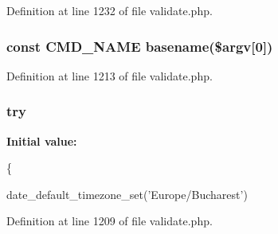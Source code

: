 Definition at line 1232 of file validate.\+php.

\hypertarget{validate_8php_a0b8cd04242aae1a86ebfb94e357edf41}{
\subsubsection[{C\+M\+D\+\_\+\+N\+A\+M\+E}]{\setlength{\rightskip}{0pt plus 5cm}const C\+M\+D\+\_\+\+N\+A\+M\+E basename(\$argv\mbox{[}0\mbox{]})}}\label{validate_8php_a0b8cd04242aae1a86ebfb94e357edf41}


Definition at line 1213 of file validate.\+php.

\hypertarget{validate_8php_abe4cc9788f52e49485473dc699537388}{
\subsubsection[{try}]{\setlength{\rightskip}{0pt plus 5cm}try}}\label{validate_8php_abe4cc9788f52e49485473dc699537388}
{\bfseries Initial value\+:}
\begin{DoxyCode}
\{
    
    date\_default\_timezone\_set(\textcolor{stringliteral}{'Europe/Bucharest'})
\end{DoxyCode}


Definition at line 1209 of file validate.\+php.

